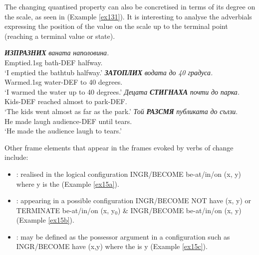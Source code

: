 \documentclass[output=paper,colorlinks,citecolor=brown]{langscibook}
\begin{document}
The changing quantised property can also be concretised in terms of its degree on the scale, as seen in  (Example \ref{ex131}). It is interesting to analyse the adverbials expressing the position of the value on the scale up to the terminal point (reaching a terminal value or state).

\begin{exe}
 \ex \label{ex131}
       \begin{xlist}
         \ex\label{ex131a}
         \gll \textit{\textbf{ИЗПРАЗНИХ}} \textit{ваната} \textit{наполовина.}\\
         Emptied.1sg bath-DEF halfway.\\
         \glt `I emptied the bathtub halfway.'
         \ex \label{ex131b}
       \gll   \textit{\textbf{ЗАТОПЛИХ}} \textit{водата} \textit{до} \textit{40 градуса.}\\
         Warmed.1sg water-DEF {to} {40 degrees}.\\
       \glt `I warmed the water up to 40 degrees.'
\ex \label{ex131c}
\gll \textit{Децата} \textit{\textbf{СТИГНАХА}} \textit{почти} \textit{до} \textit{парка.}\\
Kids-DEF reached almost to park-DEF.\\
\glt `The kids went almost as far as the park.'
\ex \label{ex131d}
\gll\textit{Той} \textit{\textbf{РАЗСМЯ}} \textit{публиката} \textit{до} \textit{сълзи}. \\
He {made laugh} audience-DEF until tears.\\
\glt `He made the audience laugh to tears.'
     \end{xlist}
\end{exe}


Other frame elements that appear in the frames evoked by verbs of change include:
\begin{itemize}
\item {}: realised in the logical configuration INGR/BECOME be-at/in/on (x, y) where y is the   (Example \ref{ex15a}).
\item {}: appearing in a possible configuration INGR/BECOME NOT have (x, y) or TERMINATE be-at/in/on (x, y$_0$) \& INGR/BECOME be-at/in/on (x, y)  (Example \ref{ex15b}).
\item {}: may be defined as the possessor argument in a configuration such as INGR/BECOME have (x,y) where the  is y  (Example \ref{ex15c}).
\end{itemize}
\end{document}

